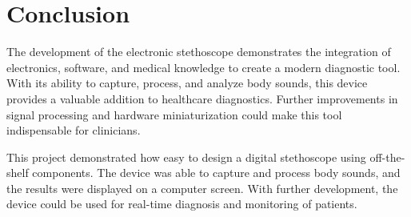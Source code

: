\chapter{Conclusion}

The development of the electronic stethoscope demonstrates the integration of electronics, software, and medical knowledge to create a modern diagnostic tool. With its ability to capture, process, and analyze body sounds, this device provides a valuable addition to healthcare diagnostics. Further improvements in signal processing and hardware miniaturization could make this tool indispensable for clinicians.

This project demonstrated how easy to design a digital stethoscope using off-the-shelf components. The device was able to capture and process body sounds, and the results were displayed on a computer screen. With further development, the device could be used for real-time diagnosis and monitoring of patients.
